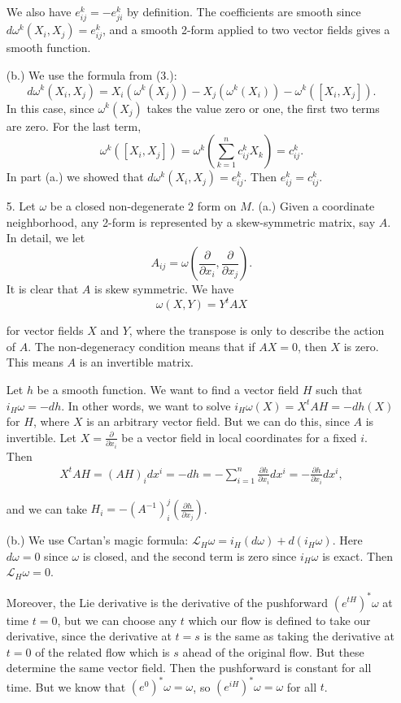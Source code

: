\documentclass[11pt, reqno]{article}
\theoremstyle{plain}
\theoremstyle{definition}
\theoremstyle{remark}
\begin{document}
\begin{enumerate}
    We also have $e_{ij}^k = - e_{ji}^k$ by definition. The coefficients are smooth since 
    $d\omega^k(X_i, X_j) = e_{ij}^k$, and a smooth 2-form applied to two vector fields gives a smooth function. 

    (b.) We use the formula from (3.):
    \[
        d\omega^k(X_i, X_j) = X_i(\omega^k(X_j)) - X_j(\omega^k(X_i)) - \omega^k([X_i, X_j]).
    \]
    In this case, since $\omega^k(X_j)$ takes the value zero or one, the first two terms are zero. For the last term,
    \[
        \omega^k([X_i, X_j]) = \omega^k\left(\sum_{k = 1}^n c_{ij}^k X_k\right) = c_{ij}^k.
    \]
    In part (a.) we showed that $d\omega^k(X_i, X_j) = e_{ij}^k$. Then $e_{ij}^k = c_{ij}^k$.

    \item[5.] Let $\omega$ be a closed non-degenerate $2$ form on $M$. 
    (a.) Given a coordinate neighborhood, any 2-form is represented 
    by a skew-symmetric matrix, say $A$. In detail, we let
    \[
        A_{ij} = \omega\left(\frac{\partial}{\partial x_i}, \frac{\partial}{\partial x_j}\right).
    \]
    It is clear that $A$ is skew symmetric. We have 
    \[
        \omega(X, Y) = Y^t A X
    \]

    for vector fields $X$ and $Y$, where the transpose is only to describe the action of $A$. 
    The non-degeneracy condition means that if $AX = 0$, then $X$ is zero. This means $A$ is an
    invertible matrix. 

    Let $h$ be a smooth function. We want to find a vector field $H$ such that $i_{H}\omega = -dh$. In 
    other words, we want to solve $i_H\omega (X) = X^t A H = -dh(X)$ for $H$, where $X$ is an arbitrary vector field. 
    But we can do this, since $A$ is invertible. Let $X = \frac{\partial}{\partial x_i}$ be a vector field in local
    coordinates for a fixed $i$. Then 
    \begin{align*}
        X^t A H = (A H)_i dx^i = -dh = -\sum_{i = 1}^n \frac{\partial h}{\partial x_i} dx^i = -\frac{\partial h}{\partial x_i}dx^i,
    \end{align*}

    and we can take $H_i = -{(A^{-1})}_i^j(\frac{\partial h}{\partial x_j})$.

    (b.) We use Cartan's magic formula: $\mathcal{L}_{H}\omega = i_H(d\omega) + d(i_H\omega)$. Here $d\omega = 0$ since $\omega$
    is closed, and the second term is zero since $i_H\omega$ is exact. Then $\mathcal{L}_H \omega = 0$. 

    Moreover, the Lie derivative is the derivative of the pushforward $(e^{tH})^*\omega$ at time $t = 0$, but we 
    can choose any $t$ which our flow is defined to take our derivative, since the derivative 
    at $t = s$ is the same as taking the derivative at $t = 0$ of the related flow which is $s$ ahead of the original
    flow. But these determine the same vector field. Then the pushforward is constant for all time. But we know 
    that $(e^{0})^*\omega = \omega$, so $(e^{iH})^*\omega = \omega$ for all $t$. 


\end{enumerate}
\end{document}
